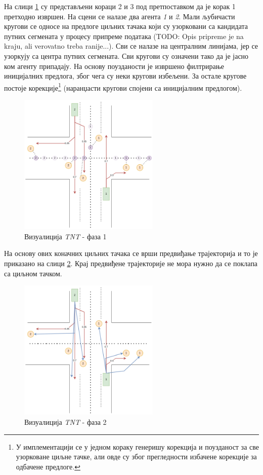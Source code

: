 \documentclass[11pt,oneside]{memoir}
\begin{document}
На слици \ref{tnt-viz-1} су представљени кораци 2 и 3 под претпоставком да је корак 1 претходно извршен. На сцени се налазе два агента 
\textit{1} и \textit{2}. Мали љубичасти кругови се односе на предлоге циљних тачака који су узорковани са кандидата путних сегмената
у процесу припреме података (TODO: Opis pripreme je na kraju, ali verovatno treba ranije...). Сви се налазе на централним линијама, 
јер се узоркују са центра путних сегмената. Сви кругови су означени тако да је јасно ком агенту припадају. На основу поузданости је 
извршено филтрирање иницијалних предлога, због чега су неки кругови избељени. За остале кругове постоје корекције\footnote{
  У имплементацији се у једном кораку генеришу корекција и поузданост за све узорковане циљне тачке, али овде су због прегледности
  избачене корекције за одбачене предлоге.
} (наранџасти кругови спојени са иницијалним предлогом).


\begin{figure}[H]
  \centering
  \includegraphics[width=0.6\textwidth]{images/tnt-viz-Page-1.drawio.png}
  \caption{Визуалиција \textit{TNT} - фаза 1 \label{tnt-viz-1}}
\end{figure}

На основу ових коначних циљних тачака се врши предвиђање трајекторија и то је приказано на слици \ref{tnt-viz-2}. Крај предвиђене трајекторије не мора
нужно да се поклапа са циљном тачком.

\begin{figure}[H]
  \centering
  \includegraphics[width=0.6\textwidth]{images/tnt-viz-Page-2.drawio.png}
  \caption{Визуалиција \textit{TNT} - фаза 2 \label{tnt-viz-2}}
\end{figure}
\end{document}
